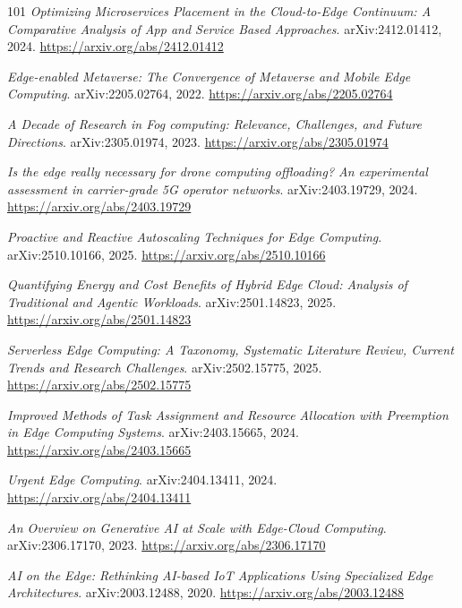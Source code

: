 \documentclass[11pt,a4paper]{article}
\begin{document}
\begin{thebibliography}{101}
\newblock \emph{Optimizing Microservices Placement in the Cloud-to-Edge Continuum: A Comparative Analysis of App and Service Based Approaches}.
\newblock arXiv:2412.01412, 2024.
\newblock \url{https://arxiv.org/abs/2412.01412}

\newblock \emph{Edge-enabled Metaverse: The Convergence of Metaverse and Mobile Edge Computing}.
\newblock arXiv:2205.02764, 2022.
\newblock \url{https://arxiv.org/abs/2205.02764}

\newblock \emph{A Decade of Research in Fog computing: Relevance, Challenges, and Future Directions}.
\newblock arXiv:2305.01974, 2023.
\newblock \url{https://arxiv.org/abs/2305.01974}

\newblock \emph{Is the edge really necessary for drone computing offloading? An experimental assessment in carrier-grade 5G operator networks}.
\newblock arXiv:2403.19729, 2024.
\newblock \url{https://arxiv.org/abs/2403.19729}

\newblock \emph{Proactive and Reactive Autoscaling Techniques for Edge Computing}.
\newblock arXiv:2510.10166, 2025.
\newblock \url{https://arxiv.org/abs/2510.10166}

\newblock \emph{Quantifying Energy and Cost Benefits of Hybrid Edge Cloud: Analysis of Traditional and Agentic Workloads}.
\newblock arXiv:2501.14823, 2025.
\newblock \url{https://arxiv.org/abs/2501.14823}

\newblock \emph{Serverless Edge Computing: A Taxonomy, Systematic Literature Review, Current Trends and Research Challenges}.
\newblock arXiv:2502.15775, 2025.
\newblock \url{https://arxiv.org/abs/2502.15775}

\newblock \emph{Improved Methods of Task Assignment and Resource Allocation with Preemption in Edge Computing Systems}.
\newblock arXiv:2403.15665, 2024.
\newblock \url{https://arxiv.org/abs/2403.15665}

\newblock \emph{Urgent Edge Computing}.
\newblock arXiv:2404.13411, 2024.
\newblock \url{https://arxiv.org/abs/2404.13411}

\newblock \emph{An Overview on Generative AI at Scale with Edge-Cloud Computing}.
\newblock arXiv:2306.17170, 2023.
\newblock \url{https://arxiv.org/abs/2306.17170}

\newblock \emph{AI on the Edge: Rethinking AI-based IoT Applications Using Specialized Edge Architectures}.
\newblock arXiv:2003.12488, 2020.
\newblock \url{https://arxiv.org/abs/2003.12488}


\end{thebibliography}
\end{document}
